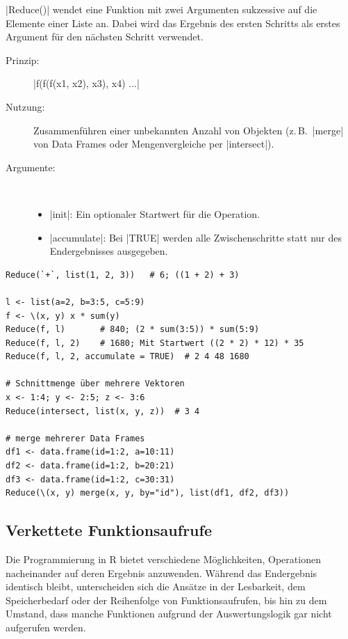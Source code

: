 \documentclass[10pt,twocolumn]{scrartcl}
\renewcommand{\lstinline}{\mycoloredinline}
\begin{document}
\lstinline|Reduce()| wendet eine Funktion mit zwei Argumenten sukzessive auf die Elemente einer Liste an. Dabei wird das Ergebnis des ersten Schritts als erstes Argument für den nächsten Schritt verwendet.

\begin{description}
\item[Prinzip:] \lstinline|f(f(f(x1, x2), x3), x4) ...|
\item[Nutzung:] Zusammenführen einer unbekannten Anzahl von Objekten (z.\,B.\ \lstinline|merge| von Data Frames oder Mengenvergleiche per \lstinline|intersect|).
\item[Argumente:] ~
  \begin{itemize}
  \item \lstinline|init|: Ein optionaler Startwert für die Operation.
  \item \lstinline|accumulate|: Bei \lstinline|TRUE| werden alle Zwischenschritte statt nur des Endergebnisses ausgegeben.
  \end{itemize}
\end{description}

\begin{lstlisting}
Reduce(`+`, list(1, 2, 3))   # 6; ((1 + 2) + 3)

l <- list(a=2, b=3:5, c=5:9)
f <- \(x, y) x * sum(y)
Reduce(f, l)       # 840; (2 * sum(3:5)) * sum(5:9)
Reduce(f, l, 2)    # 1680; Mit Startwert ((2 * 2) * 12) * 35
Reduce(f, l, 2, accumulate = TRUE)  # 2 4 48 1680

# Schnittmenge über mehrere Vektoren
x <- 1:4; y <- 2:5; z <- 3:6
Reduce(intersect, list(x, y, z))  # 3 4

# merge mehrerer Data Frames
df1 <- data.frame(id=1:2, a=10:11)
df2 <- data.frame(id=1:2, b=20:21)
df3 <- data.frame(id=1:2, c=30:31)
Reduce(\(x, y) merge(x, y, by="id"), list(df1, df2, df3))
\end{lstlisting}


\subsection{Verkettete Funktionsaufrufe}

Die Programmierung in R bietet verschiedene Möglichkeiten, Operationen nacheinander auf deren Ergebnis anzuwenden. Während das Endergebnis identisch bleibt, unterscheiden sich die Ansätze in der Lesbarkeit, dem Speicherbedarf oder der Reihenfolge von Funktionsaufrufen, bis hin zu dem Umstand, dass manche Funktionen aufgrund der Auswertungslogik gar nicht aufgerufen werden.
\end{document}

